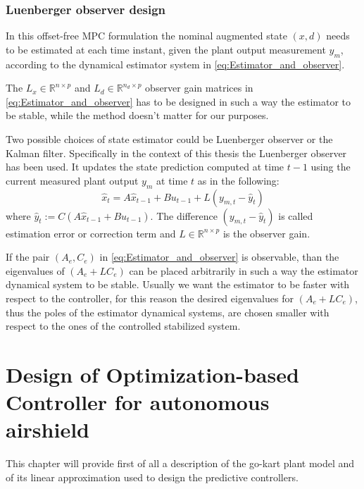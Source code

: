\documentclass[a4paper,12pt,oneside]{book}
\begin{document}
\subsection*{Luenberger observer design}

In this offset-free MPC formulation the nominal augmented state $(x,d)$ needs to be estimated at each time instant, given the plant output measurement $y_m$, according to the dynamical estimator system in \eqref{eq:Estimator_and_observer}.

The $L_x \in \mathbb{R}^{n \times p}$ and $L_d \in \mathbb{R}^{n_d \times p} $ observer gain matrices in \eqref{eq:Estimator_and_observer} has to be designed in such a way the estimator to be stable, while the method doesn't matter for our purposes.

\bigskip
Two possible choices of state estimator could be Luenberger observer or the Kalman filter. 
Specifically in the context of this thesis the Luenberger observer has been used.
It updates the state prediction computed at time $t-1$ using the current measured plant output $y_m$ at time $t$ as in the following:
\begin{equation}
    \hat{x}_t = A \hat{x}_{t-1} + B u_{t-1} + L (y_{m,t} - \hat{y}_t)
\end{equation}
where $\hat{y}_t := C(A \hat{x}_{t-1} + B u_{t-1})$.
The difference $(y_{m,t} - \hat{y}_t)$ is called estimation error or correction term and $L \in \mathbb{R}^{n \times p}$ is the observer gain.

\bigskip
If the pair $(A_e,C_e)$ in \eqref{eq:Estimator_and_observer} is observable, than the eigenvalues of $(A_e+LC_e)$ can be placed arbitrarily in such a way the estimator dynamical system to be stable.
Usually we want the estimator to be faster with respect to the controller, for this reason the desired eigenvalues for $(A_e+LC_e)$, thus the poles of the estimator dynamical systems, are chosen smaller with respect to the ones of the controlled stabilized system.

\chapter{Design of Optimization-based Controller for autonomous airshield}
\label{chapter:Control_design}
This chapter will provide first of all a description of the go-kart plant model and of its linear approximation used to design the predictive controllers. 
\end{document}
